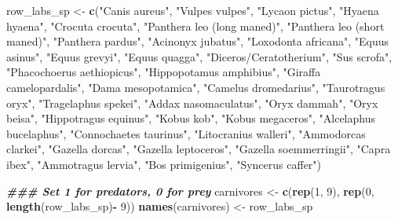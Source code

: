 \documentclass[
]{article}
\newenvironment{Shaded}{\begin{snugshade}}{\end{snugshade}}
\newcommand{\DecValTok}[1]{\textcolor[rgb]{0.00,0.00,0.81}{#1}}
\newcommand{\DocumentationTok}[1]{\textcolor[rgb]{0.56,0.35,0.01}{\textbf{\textit{#1}}}}
\newcommand{\FunctionTok}[1]{\textcolor[rgb]{0.13,0.29,0.53}{\textbf{#1}}}
\newcommand{\NormalTok}[1]{#1}
\newcommand{\OtherTok}[1]{\textcolor[rgb]{0.56,0.35,0.01}{#1}}
\newcommand{\SpecialCharTok}[1]{\textcolor[rgb]{0.81,0.36,0.00}{\textbf{#1}}}
\newcommand{\StringTok}[1]{\textcolor[rgb]{0.31,0.60,0.02}{#1}}
\begin{document}
\begin{Shaded}
\begin{Highlighting}[]
\NormalTok{row\_labs\_sp }\OtherTok{\textless{}{-}} \FunctionTok{c}\NormalTok{(}\StringTok{"Canis aureus"}\NormalTok{, }\StringTok{"Vulpes vulpes"}\NormalTok{, }\StringTok{"Lycaon pictus"}\NormalTok{, }\StringTok{"Hyaena hyaena"}\NormalTok{, }\StringTok{"Crocuta crocuta"}\NormalTok{, }\StringTok{"Panthera leo (long maned)"}\NormalTok{, }\StringTok{"Panthera leo (short maned)"}\NormalTok{, }\StringTok{"Panthera pardus"}\NormalTok{, }\StringTok{"Acinonyx jubatus"}\NormalTok{, }\StringTok{"Loxodonta africana"}\NormalTok{, }\StringTok{"Equus asinus"}\NormalTok{, }\StringTok{"Equus grevyi"}\NormalTok{, }\StringTok{"Equus quagga"}\NormalTok{, }\StringTok{"Diceros/Ceratotherium"}\NormalTok{, }\StringTok{"Sus scrofa"}\NormalTok{,  }\StringTok{"Phacochoerus aethiopicus"}\NormalTok{, }\StringTok{"Hippopotamus amphibius"}\NormalTok{, }\StringTok{"Giraffa camelopardalis"}\NormalTok{, }\StringTok{"Dama mesopotamica"}\NormalTok{, }\StringTok{"Camelus dromedarius"}\NormalTok{, }\StringTok{"Taurotragus oryx"}\NormalTok{, }\StringTok{"Tragelaphus spekei"}\NormalTok{, }\StringTok{"Addax nasomaculatus"}\NormalTok{, }\StringTok{"Oryx dammah"}\NormalTok{, }\StringTok{"Oryx beisa"}\NormalTok{, }\StringTok{"Hippotragus equinus"}\NormalTok{, }\StringTok{"Kobus kob"}\NormalTok{, }\StringTok{"Kobus megaceros"}\NormalTok{, }\StringTok{"Alcelaphus bucelaphus"}\NormalTok{, }\StringTok{"Connochaetes taurinus"}\NormalTok{, }\StringTok{"Litocranius walleri"}\NormalTok{, }\StringTok{"Ammodorcas clarkei"}\NormalTok{, }\StringTok{"Gazella dorcas"}\NormalTok{, }\StringTok{"Gazella leptoceros"}\NormalTok{, }\StringTok{"Gazella soemmerringii"}\NormalTok{, }\StringTok{"Capra ibex"}\NormalTok{, }\StringTok{"Ammotragus lervia"}\NormalTok{, }\StringTok{"Bos primigenius"}\NormalTok{, }\StringTok{"Syncerus caffer"}\NormalTok{)}

\DocumentationTok{\#\#\#  Set 1 for predators, 0 for prey  }
\NormalTok{carnivores }\OtherTok{\textless{}{-}} \FunctionTok{c}\NormalTok{(}\FunctionTok{rep}\NormalTok{(}\DecValTok{1}\NormalTok{, }\DecValTok{9}\NormalTok{), }\FunctionTok{rep}\NormalTok{(}\DecValTok{0}\NormalTok{, }\FunctionTok{length}\NormalTok{(row\_labs\_sp)}\SpecialCharTok{{-}} \DecValTok{9}\NormalTok{))}
\FunctionTok{names}\NormalTok{(carnivores) }\OtherTok{\textless{}{-}}\NormalTok{ row\_labs\_sp}
\end{Highlighting}
\end{Shaded}
\end{document}
